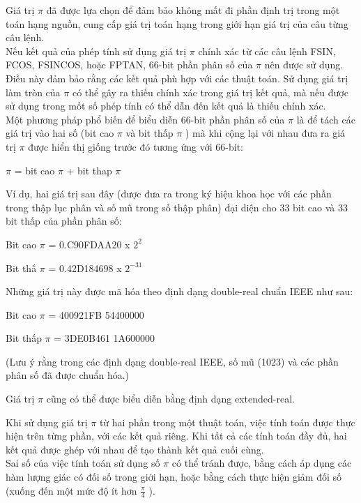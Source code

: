 		Giá trị $\pi$ đã được lựa chọn để đảm bảo không mất đi phần định trị trong một toán hạng nguồn, cung cấp giá trị toán hạng trong giới hạn giá trị của câu từng câu lệnh.\\
		
		Nếu kết quả của phép tính sử dụng giá trị $\pi$ chính xác từ các câu lệnh FSIN, FCOS, FSINCOS, hoặc FPTAN, 66-bit phần phân số của  $\pi$ nên được sử dụng. Điều này đảm bảo rằng các kết quả phù hợp với các thuật toán. Sử dụng giá trị làm tròn của $\pi$  có thể gây ra thiếu chính xác trong giá trị kết quả, mà nếu được sử dụng trong mốt số phép tính có thể dẫn đến kết quả là thiếu chính xác.\\
		
		Một phương pháp phổ biến để biểu diễn 66-bit phần phân số của   $\pi$ là để tách các giá trị vào hai số (bit cao  $\pi$  và bit thấp  $\pi$ ) mà khi cộng lại với nhau đưa ra giá trị  $\pi$ được hiển thị giống trước đó tương ứng với 66-bit:
		
		
		 $\pi$  = bit cao $\pi$  + bit thap  $\pi$ 


		Ví dụ, hai giá trị sau đây (được đưa ra trong ký hiệu khoa học với các phần trong thập lục phân và số mũ trong số thập phân) đại diện cho 33 bit cao và 33 bit thấp của phần phân số:
		
		
		Bit cao  $\pi$  = 0.C90FDAA20 x $2^{ 2}$


		Bit thấ  $\pi$  = 0.42D184698 x $2^{-31}$


		Những giá trị này được mã hóa theo định dạng double-real chuẩn IEEE như sau:
		
		
		Bit cao  $\pi$  = 400921FB 54400000


		Bit thấp  $\pi$ = 3DE0B461 1A600000
		
		
		(Lưu ý rằng trong các định dạng double-real IEEE, số mũ (1023) và các phần phân số đã được chuẩn hóa.)
		
		Giá trị  $\pi$  cũng có thể được biểu diễn bằng định dạng extended-real.


		Khi sử dụng giá trị  $\pi$ từ hai phần trong một thuật toán, việc tính toán được thực hiện trên từng phần, với các kết quả riêng. Khi tất cả các tính toán đầy đủ, hai kết quả được ghép với nhau để tạo thành kết quả cuối cùng.\\
		
		Sai số của việc tính toán sử dụng số  $\pi$  có thể tránh được, bằng cách áp dụng các hàm lượng giác có đối số trong giới hạn, hoặc bằng cách thực hiện giảm đối số (xuống đến một mức độ ít hơn  $\frac{\pi}{4}$ ).
		
